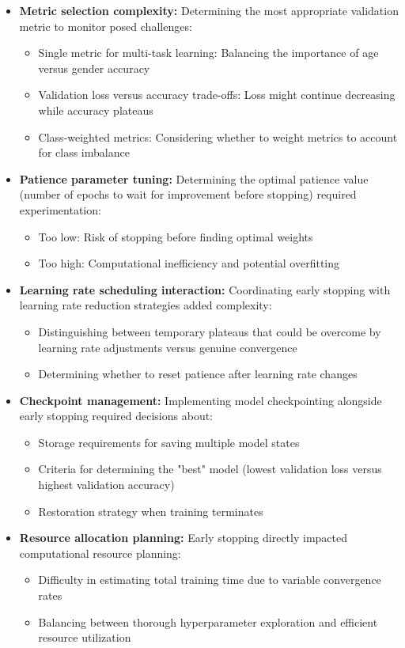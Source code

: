 \documentclass{article}
\begin{document}
\begin{itemize}
    \item \textbf{Metric selection complexity:} Determining the most appropriate validation metric to monitor posed challenges:
    \begin{itemize}
        \item Single metric for multi-task learning: Balancing the importance of age versus gender accuracy
        \item Validation loss versus accuracy trade-offs: Loss might continue decreasing while accuracy plateaus
        \item Class-weighted metrics: Considering whether to weight metrics to account for class imbalance
    \end{itemize}

    \item \textbf{Patience parameter tuning:} Determining the optimal patience value (number of epochs to wait for improvement before stopping) required experimentation:
    \begin{itemize}
        \item Too low: Risk of stopping before finding optimal weights
        \item Too high: Computational inefficiency and potential overfitting
    \end{itemize}

    \item \textbf{Learning rate scheduling interaction:} Coordinating early stopping with learning rate reduction strategies added complexity:
    \begin{itemize}
        \item Distinguishing between temporary plateaus that could be overcome by learning rate adjustments versus genuine convergence
        \item Determining whether to reset patience after learning rate changes
    \end{itemize}

    \item \textbf{Checkpoint management:} Implementing model checkpointing alongside early stopping required decisions about:
    \begin{itemize}
        \item Storage requirements for saving multiple model states
        \item Criteria for determining the "best" model (lowest validation loss versus highest validation accuracy)
        \item Restoration strategy when training terminates
    \end{itemize}

    \item \textbf{Resource allocation planning:} Early stopping directly impacted computational resource planning:
    \begin{itemize}
        \item Difficulty in estimating total training time due to variable convergence rates
        \item Balancing between thorough hyperparameter exploration and efficient resource utilization
    \end{itemize}
\end{itemize}
\end{document}
